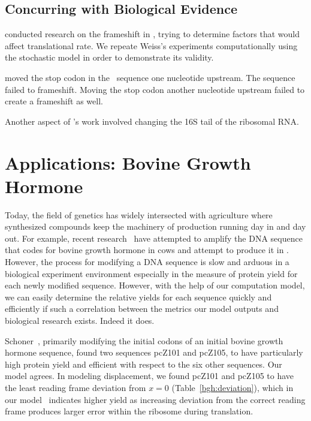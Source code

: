 \documentclass[12pt, draft]{article}
\numberwithin{equation}{section}
\begin{document}
\subsection{Concurring with Biological Evidence}

\citet{weiss87,weiss88} conducted research on the
frameshift in \prfB, trying to determine factors that would affect
translational rate.  We repeate Weiss's experiments computationally
using the stochastic model in order to demonstrate its validity.


\citeauthor{weiss88} moved the stop codon in the \prfB\ sequence one nucleotide upstream.  
The sequence failed to frameshift.  
Moving the stop codon another nucleotide upstream failed to create a frameshift as well.


Another aspect of \citeauthor{weiss88}'s  work involved changing the 16S tail of the ribosomal RNA.

\section{Applications: Bovine Growth Hormone}
Today, the field of genetics has widely intersected with
agriculture where synthesized compounds keep the machinery of
production running day in and day out. For example, recent
research~\cite{schoner:bgh} have attempted to amplify the DNA sequence
that codes for bovine growth hormone in cows and attempt to produce it
in \ecoli. However, the process for modifying a DNA sequence is slow
and arduous in a biological experiment environment especially in the
measure of protein yield for each newly modified sequence. However,
with the help of our computation model, we can easily determine the
relative yields for each sequence quickly and efficiently if such a
correlation between the metrics our model outputs and biological
research exists. Indeed it does.

Schoner~\cite{schoner:bgh}, primarily modifying the initial codons of an initial
bovine growth hormone sequence, found two sequences pcZ101 and pcZ105,
to have particularly high protein yield and efficient with respect to
the six other sequences. Our model agrees. In modeling displacement,
we found pcZ101 and pcZ105 to have the least reading frame deviation
from $x = 0$ (Table~\ref{bgh:deviation}), which in our model~\cite{lalit:mechanics} indicates
higher yield as increasing deviation from the correct reading frame
produces larger error within the ribosome during translation.
\end{document}

